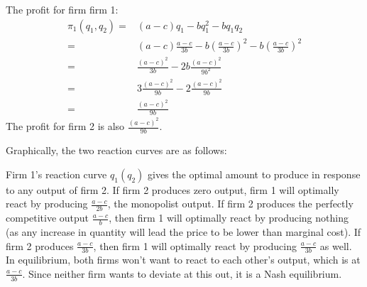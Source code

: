 \documentclass{article}
\begin{document}
The profit for firm firm 1:
\begin{align*}
  \pi_1\left( q_1,q_2 \right)=&\left( a-c \right)q_1-bq_1^2 - bq_1q_2 \\
  =&\left( a-c \right)\frac{a-c}{3b} - b\left( \frac{a-c}{3b} \right)^2 - b\left( \frac{a-c}{3b} \right)^2 \\
  =& \frac{\left( a-c \right)^2}{3b}-2b\frac{\left( a-c \right)^2}{9b^2} \\
  =& 3\frac{\left( a-c \right)^2}{9b}-2\frac{\left( a-c \right)^2}{9b} \\
  =& \frac{\left( a-c \right)^2}{9b}
\end{align*}
The profit for firm 2 is also $\frac{\left( a-c \right)^2}{9b}$.

Graphically, the two reaction curves are as follows:
\begin{center}
\end{center}
Firm 1's reaction curve $q_1\left( q_2 \right)$ gives the optimal amount to produce in response to any output of firm 2. If firm 2 produces zero output, firm 1 will optimally react by producing $\frac{a-c}{2b}$, the monopolist output. If firm 2 produces the perfectly competitive output $\frac{a-c}{b}$, then firm 1 will optimally react by producing nothing (as any increase in quantity will lead the price to be lower than marginal cost). If firm 2 produces $\frac{a-c}{3b}$, then firm 1 will optimally react by producing $\frac{a-c}{3b}$ as well. In equilibrium, both firms won't want to react to each other's output, which is at $\frac{a-c}{3b}$. Since neither firm wants to deviate at this out, it is a Nash equilibrium.
\end{document}
